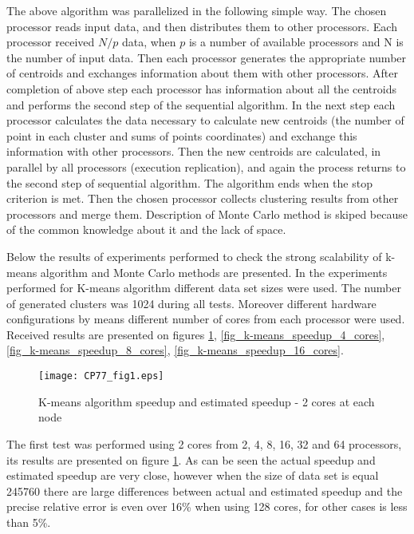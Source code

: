 \documentclass[runningheads]{llncs}
\begin{document}
The above algorithm was parallelized in the following simple way. The chosen processor reads input data, and then distributes them to other processors. Each processor received  $N/p$ data, when $p$ is a number of available processors and N is the number of input data. Then each processor generates the appropriate number of centroids and exchanges information about them with other processors. After completion of above step each processor has information about all the centroids and performs the second step of the sequential algorithm. In the next step each processor calculates the data necessary to calculate new centroids (the number of point in each cluster and sums of points coordinates) and exchange this information with other processors. Then the new centroids are calculated, in parallel by all processors  (execution replication), and again the process returns to the second step of sequential algorithm. The algorithm ends when the stop criterion is met. Then the chosen processor collects clustering results from other processors and merge them. Description of Monte Carlo method is skiped because of the common knowledge about it and the lack of space. 

Below the results of experiments performed to check the strong scalability of k-means algorithm and Monte Carlo methods are presented. In the experiments performed for K-means algorithm different data set sizes were used. The number of generated clusters was 1024 during all tests. Moreover different hardware configurations by means different number of cores from each processor were used. Received results are presented on figures  \ref{fig_k-means_speedup_2_cores}, \ref{fig_k-means_speedup_4_cores}, \ref{fig_k-means_speedup_8_cores}, \ref{fig_k-means_speedup_16_cores}.

\begin{figure}[bht!]
  \centering
  \texttt{[image: CP77\_fig1.eps]}
  \caption{K-means algorithm speedup and estimated speedup - 2 cores at each node}
  \label{fig_k-means_speedup_2_cores}
\end{figure}

The first test was performed using 2 cores from 2, 4, 8, 16, 32 and 64 processors, its results are presented on figure \ref{fig_k-means_speedup_2_cores}. As can be seen the actual speedup and estimated speedup are very close, however when the size of data set is equal 245760 there are large differences between actual and estimated speedup and the precise relative error is even over 16\% when using 128 cores, for other cases is less than 5\%. 
\end{document}
